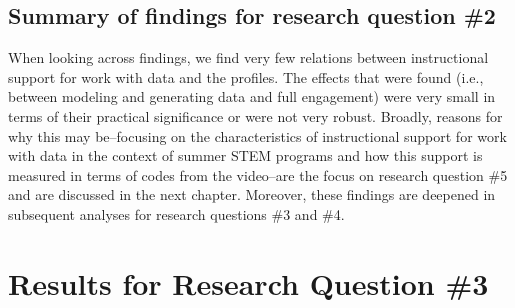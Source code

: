 \documentclass[]{msu-thesis}
\theoremstyle{definition}
\theoremstyle{definition}
\theoremstyle{definition}
\theoremstyle{remark}
\begin{document}
\begin{landscape}\begin{table}

\caption{\label{tab:unnamed-chunk-13}Results of mixed effects models for the composite}
\centering
{}
\end{table}
\end{landscape}

\subsection{Summary of findings for research question
\#2}\label{summary-of-findings-for-research-question-2}

When looking across findings, we find very few relations between
instructional support for work with data and the profiles. The effects
that were found (i.e., between modeling and generating data and full
engagement) were very small in terms of their practical significance or
were not very robust. Broadly, reasons for why this may be--focusing on
the characteristics of instructional support for work with data in the
context of summer STEM programs and how this support is measured in
terms of codes from the video--are the focus on research question \#5
and are discussed in the next chapter. Moreover, these findings are
deepened in subsequent analyses for research questions \#3 and \#4.

\section{Results for Research Question
\#3}\label{results-for-research-question-3}
\end{document}
